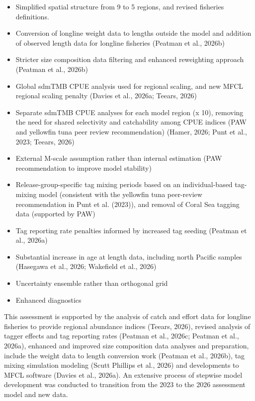 \documentclass[
  english,
  a4paper,
  a4paper,
  11pt]{SCreport}
\begin{document}
\begin{itemize}
\item
  Simplified spatial structure from 9 to 5 regions, and revised
  fisheries definitions.
\item
  Conversion of longline weight data to lengths outside the model and
  addition of observed length data for longline fisheries (Peatman et
  al., 2026b)
\item
  Stricter size composition data filtering and enhanced reweighting
  approach (Peatman et al., 2026b)
\item
  Global sdmTMB CPUE analysis used for regional scaling, and new MFCL
  regional scaling penalty (Davies et al., 2026a; Teears, 2026)
\item
  Separate sdmTMB CPUE analyses for each model region (x 10), removing
  the need for shared selectivity and catchability among CPUE indices
  (PAW and yellowfin tuna peer review recommendation) (Hamer, 2026; Punt
  et al., 2023; Teears, 2026)
\item
  External M-scale assumption rather than internal estimation (PAW
  recommendation to improve model stability)
\item
  Release-group-specific tag mixing periods based on an individual-based
  tag-mixing model (consistent with the yellowfin tuna peer-review
  recommendation in Punt et al. (2023)), and removal of Coral Sea
  tagging data (supported by PAW)
\item
  Tag reporting rate penalties informed by increased tag seeding
  (Peatman et al., 2026a)
\item
  Substantial increase in age at length data, including north Pacific
  samples (Hasegawa et al., 2026; Wakefield et al., 2026)
\item
  Uncertainty ensemble rather than orthogonal grid
\item
  Enhanced diagnostics
\end{itemize}

This assessment is supported by the analysis of catch and effort data
for longline fisheries to provide regional abundance indices (Teears,
2026), revised analysis of tagger effects and tag reporting rates
(Peatman et al., 2026c; Peatman et al., 2026a), enhanced and improved
size composition data analyses and preparation, include the weight data
to length conversion work (Peatman et al., 2026b), tag mixing simulation
modeling (Scutt Phillips et al., 2026) and developments to MFCL software
(Davies et al., 2026a). An extensive process of stepwise model
development was conducted to transition from the 2023 to the 2026
assessment model and new data.
\end{document}
